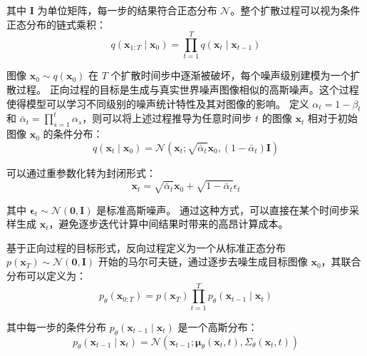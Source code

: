 其中 $\mathbf{I}$ 为单位矩阵，每一步的结果符合正态分布 $\mathcal{N}$。整个扩散过程可以视为条件正态分布的链式乘积：
\begin{equation}
    q\left(\mathbf{x}_{1: T} \mid \mathbf{x}_0\right)=\prod_{t=1}^T q\left(\mathbf{x}_t \mid \mathbf{x}_{t-1}\right)
\end{equation}

图像 $\mathbf{x}_0 \sim q\left(\mathbf{x}_0\right)$ 在 $T$ 个扩散时间步中逐渐被破坏，每个噪声级别建模为一个扩散过程。
正向过程的目标是生成与真实世界噪声图像相似的高斯噪声。这个过程使得模型可以学习不同级别的噪声统计特性及其对图像的影响。
定义 $\alpha_t=1-\beta_t$ 和  $\bar{\alpha}_t = \prod_{s=1}^t \alpha_s$，则可以将上述过程推导为任意时间步 $t$ 的图像 $\mathbf{x}_t$ 相对于初始图像 $\mathbf{x}_0$ 的条件分布：
\begin{equation}
    \label{eq:q}
q\left(\mathbf{x}_t \mid \mathbf{x}_0\right)=\mathcal{N}\left(\mathbf{x}_t ; \sqrt{\bar{\alpha}_t} \mathbf{x}_0,\left(1-\bar{\alpha}_t\right) \mathbf{I}\right)
\end{equation}

可以通过重参数化转为封闭形式：
\begin{equation}
    \label{eq:x0_xt}
    \mathbf{x}_t=\sqrt{\bar{\alpha}_t} \mathbf{x}_0+\sqrt{1-\bar{\alpha}_t} \epsilon_t
\end{equation}

其中 $\boldsymbol{\epsilon}_t \sim \mathcal{N}(\mathbf{0}, \mathbf{I})$ 是标准高斯噪声。
通过这种方式，可以直接在某个时间步采样生成 $\mathbf{x}_t$，避免逐步迭代计算中间结果时带来的高昂计算成本。


基于正向过程的目标形式，反向过程定义为一个从标准正态分布 $p\left(\mathbf{x}_T\right) \sim \mathcal{N}(\mathbf{0}, \mathbf{I})$ 开始的马尔可夫链，通过逐步去噪生成目标图像 $\mathbf{x}_0$，其联合分布可以定义为：
\begin{equation}
\label{eq:p_total}
    p_\theta\left(\mathbf{x}_{0: T}\right) =p\left(\mathbf{x}_T\right) \prod_{t=1}^T p_\theta\left(\mathbf{x}_{t-1} \mid \mathbf{x}_t\right)
\end{equation}

其中每一步的条件分布 $p_\theta(\mathbf{x}_{t-1} \mid \mathbf{x}_t)$ 是一个高斯分布：
\begin{equation}
\label{eq:p}
    p_\theta\left(\mathbf{x}_{t-1} \mid \mathbf{x}_t\right) =\mathcal{N}\left(\mathbf{x}_{t-1} ; \boldsymbol{\mu}_\theta\left(\mathbf{x}_t, t\right), \Sigma_\theta\left(\mathbf{x}_t, t\right)\right) 
\end{equation}

